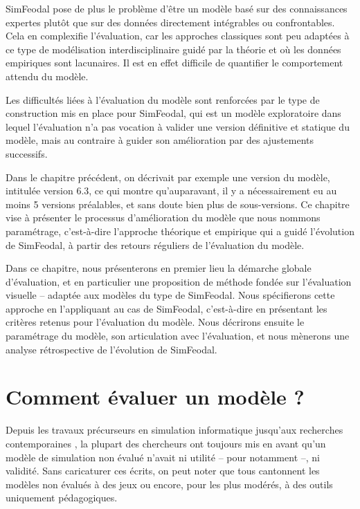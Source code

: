 SimFeodal pose de plus le problème d'être un modèle basé sur des connaissances expertes plutôt que sur des données directement intégrables ou confrontables.
Cela en complexifie l'évaluation, car les approches classiques sont peu adaptées à ce type de modélisation interdisciplinaire guidé par la théorie et où les données empiriques sont lacunaires.
Il est en effet difficile de quantifier le comportement attendu du modèle.

Les difficultés liées à l'évaluation du modèle sont renforcées par le type de construction mis en place pour SimFeodal, qui est un modèle exploratoire dans lequel l'évaluation n'a pas vocation à valider une version définitive et statique du modèle, mais au contraire à guider son amélioration par des ajustements successifs.

Dans le chapitre précédent, on décrivait par exemple une \og version\fg{} du modèle, intitulée \og version 6.3\fg{}, ce qui montre qu'auparavant, il y a nécessairement eu au moins 5 versions préalables, et sans doute bien plus de sous-versions.
Ce chapitre vise à présenter le processus d'amélioration du modèle que nous nommons \og paramétrage\fg{}, c'est-à-dire l'approche théorique et empirique qui a guidé l'évolution de SimFeodal, à partir des retours réguliers de l'évaluation du modèle.

Dans ce chapitre, nous présenterons en premier lieu la démarche globale d'évaluation, et en particulier une proposition de méthode fondée sur l'évaluation visuelle -- adaptée aux modèles du type de SimFeodal.
Nous spécifierons cette approche en l'appliquant au cas de SimFeodal, c'est-à-dire en présentant les critères retenus pour l'évaluation du modèle.
Nous décrirons ensuite le paramétrage du modèle, son articulation avec l'évaluation, et nous mènerons une analyse rétrospective de l'évolution de SimFeodal.

\section{Comment évaluer un modèle ?}\label{sec:evaluer-modele}

Depuis les travaux précurseurs en simulation informatique \autocite{naylor_verification_1967,hermann_validation_1967,sargent_validation_1979} jusqu'aux recherches contemporaines \autocite{amblard_evaluation_2006,banos_pour_2013,augusiak_merging_2014, rey-coyrehourcq_plateforme_2015}, la plupart des chercheurs ont toujours mis en avant qu'un modèle de simulation non évalué n'avait ni utilité -- pour \cite{naylor_verification_1967} notamment --, ni validité.
Sans caricaturer ces écrits, on peut noter que tous cantonnent les modèles non évalués à des \og jeux\fg{} ou encore, pour les plus modérés, à des outils uniquement pédagogiques.

